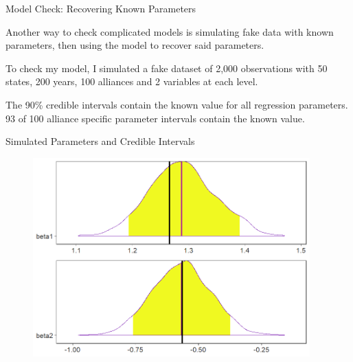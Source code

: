 \documentclass[12pt]{beamer}
\begin{document}

\begin{frame}{Model Check: Recovering Known Parameters}

Another way to check complicated models is simulating fake data with known parameters, then using the model to recover said parameters. 

To check my model, I simulated a fake dataset of 2,000 observations with 50 states, 200 years, 100 alliances and 2 variables at each level.

The 90\% credible intervals contain the known value for all regression parameters. 93 of 100 alliance specific parameter intervals contain the known value. 

\end{frame}



\begin{frame}{Simulated Parameters and Credible Intervals}


\begin{figure}
	\centering
		\includegraphics[width=0.95\textwidth]{sim-check-res.png}
\end{figure} 

\end{frame}



\end{document}
